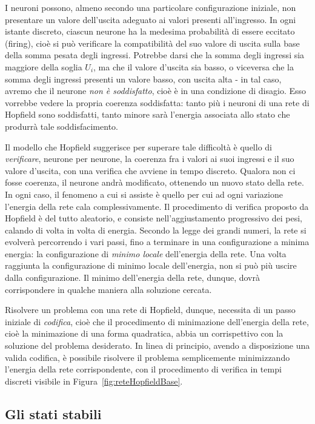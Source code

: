 \documentclass[10pt]{book}
\begin{document}
I neuroni possono, almeno secondo una particolare configurazione iniziale, non
presentare un valore dell'uscita adeguato ai valori presenti all'ingresso. In
ogni istante discreto, ciascun neurone ha la medesima probabilità di essere
eccitato (firing), cioè si può verificare la compatibilità del suo valore di
uscita sulla base della somma pesata degli ingressi. Potrebbe darsi che la
somma degli ingressi sia maggiore della soglia $U_i$, ma che il valore d'uscita
sia basso, o viceversa che la somma degli ingressi presenti un valore basso, con uscita alta \-- in tal caso, avremo che il neurone \emph{non è soddisfatto}, cioè
è in una condizione di disagio. Esso vorrebbe vedere la propria coerenza
soddisfatta: tanto più i neuroni di una rete di Hopfield sono soddisfatti,
tanto minore sarà l'energia associata allo stato che produrrà tale
soddisfacimento. 

Il modello che Hopfield suggerisce per superare tale
difficoltà è quello di \emph{verificare}, neurone per neurone, la coerenza fra i
valori ai suoi ingressi e il suo valore d'uscita, con una verifica che avviene
in tempo discreto. Qualora non ci fosse coerenza, il neurone andrà modificato,
ottenendo un nuovo stato della rete. In ogni caso, il fenomeno a cui si assiste
è quello per cui ad ogni variazione l'energia della rete cala complessivamente.
Il procedimento di verifica proposto da Hopfield è del tutto aleatorio, e consiste
nell'aggiustamento progressivo dei pesi, calando di volta in volta di energia. Secondo la legge dei grandi numeri, la rete si evolverà percorrendo i vari passi, fino a terminare in una configurazione a minima energia: la configurazione di \emph{minimo locale} dell'energia della rete.
Una volta raggiunta la configurazione di minimo locale dell'energia, non
si può più uscire dalla configurazione. Il minimo dell'energia della rete,
dunque, dovrà corrispondere in qualche maniera alla soluzione cercata. 

Risolvere un problema con una rete di Hopfield, dunque, necessita di un passo
iniziale di \emph{codifica}, cioè che il procedimento di minimazione
dell'energia della rete, cioè la minimazione di una forma quadratica, abbia un
corrispettivo con la soluzione del problema desiderato. In linea di principio,
avendo a disposizione una valida codifica, è possibile risolvere il problema
semplicemente minimizzando l'energia della rete corrispondente, con il
procedimento di verifica in tempi discreti visibile in
Figura~\ref{fig:reteHopfieldBase}.

\subsection{Gli stati stabili}
\end{document}
